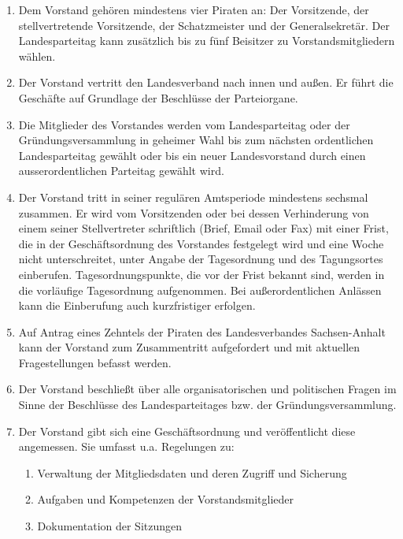 \documentclass[draft,a4paper,10pt]{article}
\begin{document}
\begin{enumerate}
\item Dem Vorstand gehören mindestens vier Piraten an: Der Vorsitzende, der
stellvertretende Vorsitzende, der Schatzmeister und der Generalsekretär. Der
Landesparteitag kann zusätzlich bis zu fünf Beisitzer zu Vorstandsmitgliedern
wählen.

\item Der Vorstand vertritt den Landesverband nach innen und außen. Er führt die
Geschäfte auf Grundlage der Beschlüsse der Parteiorgane.

\item Die Mitglieder des Vorstandes werden vom Landesparteitag oder der
Gründungsversammlung in geheimer Wahl bis zum nächsten ordentlichen
Landesparteitag gewählt oder bis ein neuer Landesvorstand durch einen
ausserordentlichen Parteitag gewählt wird.

\item Der Vorstand tritt in seiner regulären Amtsperiode mindestens sechsmal
zusammen. Er wird vom Vorsitzenden oder bei dessen Verhinderung von einem seiner
Stellvertreter schriftlich (Brief, Email oder Fax) mit einer Frist, die in der
Geschäftsordnung des Vorstandes festgelegt wird und eine Woche nicht
unterschreitet, unter Angabe der Tagesordnung und des Tagungsortes einberufen.
Tagesordnungspunkte, die vor der Frist bekannt sind, werden in die vorläufige
Tagesordnung aufgenommen. Bei außerordentlichen Anlässen kann die Einberufung
auch kurzfristiger erfolgen.

\item Auf Antrag eines Zehntels der Piraten des Landesverbandes Sachsen-Anhalt
kann der Vorstand zum Zusammentritt aufgefordert und mit aktuellen
Fragestellungen befasst werden.

\item Der Vorstand beschließt über alle organisatorischen und politischen Fragen
im Sinne der Beschlüsse des Landesparteitages bzw. der Gründungsversammlung.

\item Der Vorstand gibt sich eine Geschäftsordnung und veröffentlicht diese
angemessen. Sie umfasst u.a. Regelungen zu:
\begin{enumerate}
\item Verwaltung der Mitgliedsdaten und deren Zugriff und Sicherung

\item Aufgaben und Kompetenzen der Vorstandsmitglieder

\item Dokumentation der Sitzungen


\end{enumerate}
\end{enumerate}
\end{document}
